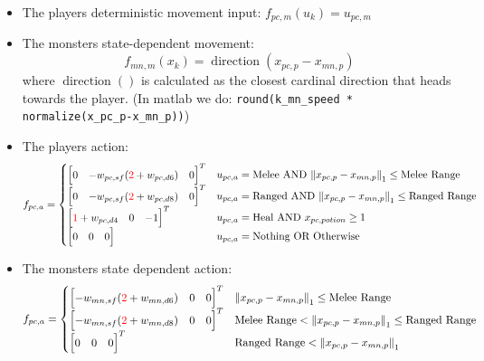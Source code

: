 \documentclass[9pt, onecolumn]{report}
\begin{document}
\begin{itemize}
    \item The players deterministic movement input: $f_{pc,m}(u_k) = u_{pc,m}$
    \item The monsters state-dependent movement:\[
        f_{mn,m}(x_k) = \operatorname{direction}(x_{pc,p} - x_{mn,p})
    \] where $\operatorname{direction}()$ is calculated as the closest cardinal direction that heads towards the player. (In matlab we do: \verb!round(k_mn_speed * normalize(x_pc_p-x_mn_p))!)
    \item The players action:\[
        f_{pc,a} = \begin{cases}
            \mqty[0 & -w_{pc,sf}({\color{red}2} + w_{pc,d6}) & 0]^T & u_{pc,a} = \text{Melee} \text{ AND } \norm{x_{pc,p} - x_{mn,p}}_1 \leq \text{Melee Range}\\
            \mqty[0 & -w_{pc,sf}({\color{red}2} + w_{pc,d8}) & 0]^T & u_{pc,a} = \text{Ranged} \text{ AND } \norm{x_{pc,p} - x_{mn,p}}_1 \leq \text{Ranged Range}\\
            \mqty[{\color{red}1} + w_{pc,d4} & 0 & -1]^T & u_{pc,a} = \text{Heal} \text{ AND } x_{pc,potion} \geq 1\\%
            \mqty[0 & 0 & 0] & u_{pc,a} = \text{Nothing} \text{ OR } \text{Otherwise}
        \end{cases}
    \]
    \item The monsters state dependent action: \[
        f_{pc,a} = \begin{cases}
            \mqty[-w_{mn,sf}({\color{red}2} + w_{mn,d6}) & 0 & 0]^T & \norm{x_{pc,p} - x_{mn,p}}_1 \leq \text{Melee Range}\\
            \mqty[- w_{mn,sf}({\color{red}2} + w_{mn,d8}) & 0 & 0]^T & \text{Melee Range} < \norm{x_{pc,p} - x_{mn,p}}_1 \leq \text{Ranged Range}\\
            \mqty[0 & 0 & 0]^T & \text{Ranged Range} < \norm{x_{pc,p} - x_{mn,p}}_1
        \end{cases}
    \]
\end{itemize}
\end{document}
